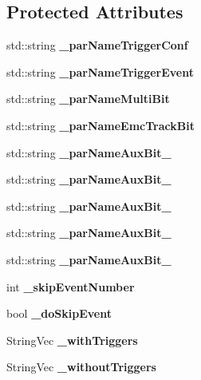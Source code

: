 \subsection*{Protected Attributes}
\begin{DoxyCompactItemize}
\item 
std\-::string {\bfseries \-\_\-par\-Name\-Trigger\-Conf}\label{classCALICE_1_1EventSelector_a55a6011de7b0d8172b22d43e4a56debc}

\item 
std\-::string {\bfseries \-\_\-par\-Name\-Trigger\-Event}\label{classCALICE_1_1EventSelector_a4b4baca2f3f77e95cd862d838685943a}

\item 
std\-::string {\bfseries \-\_\-par\-Name\-Multi\-Bit}\label{classCALICE_1_1EventSelector_a0fa26085b0edc026bed4327de8484f5c}

\item 
std\-::string {\bfseries \-\_\-par\-Name\-Emc\-Track\-Bit}\label{classCALICE_1_1EventSelector_abd154eefb301761d2f81e0140c345f8c}

\item 
std\-::string {\bfseries \-\_\-par\-Name\-Aux\-Bit\-\_}\label{classCALICE_1_1EventSelector_ac18402539a3ccc1bbca3f8f6d6af8352}

\item 
std\-::string {\bfseries \-\_\-par\-Name\-Aux\-Bit\-\_}\label{classCALICE_1_1EventSelector_ab3c66ddc0fcae41c5852d3fe37e7da5a}

\item 
std\-::string {\bfseries \-\_\-par\-Name\-Aux\-Bit\-\_}\label{classCALICE_1_1EventSelector_aa0ff952248fde6503c116cfdb50aca69}

\item 
std\-::string {\bfseries \-\_\-par\-Name\-Aux\-Bit\-\_}\label{classCALICE_1_1EventSelector_ac8b4bcd0d83832ce8a730278c71841cb}

\item 
std\-::string {\bfseries \-\_\-par\-Name\-Aux\-Bit\-\_}\label{classCALICE_1_1EventSelector_a33d71bde813c37e031c471a355553553}

\item 
int {\bfseries \-\_\-skip\-Event\-Number}\label{classCALICE_1_1EventSelector_aca6cfa2d32b5c09f69596c7ba552f23b}

\item 
bool {\bfseries \-\_\-do\-Skip\-Event}\label{classCALICE_1_1EventSelector_aabe06d7a66486b7ffbba539699929e87}

\item 
String\-Vec {\bfseries \-\_\-with\-Triggers}\label{classCALICE_1_1EventSelector_ab6647a10b50b6daed53294286c912c2f}

\item 
String\-Vec {\bfseries \-\_\-without\-Triggers}\label{classCALICE_1_1EventSelector_a5197c32c6f221c58c770bdbce085ecfb}

\end{DoxyCompactItemize}


